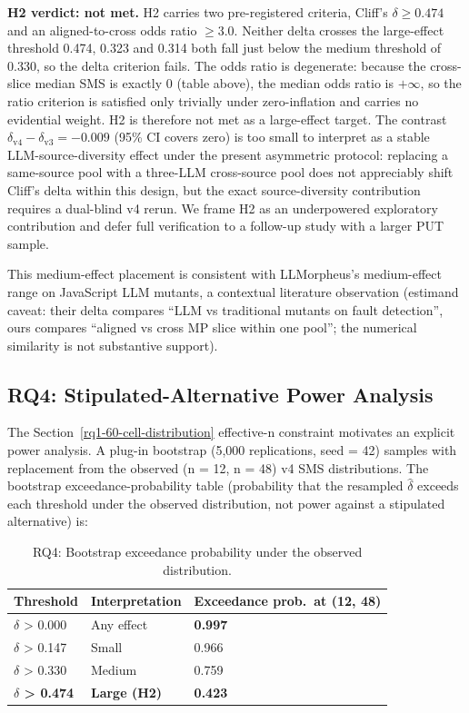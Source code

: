 \documentclass[12pt]{article}
\begin{document}
\textbf{H2 verdict: not met.} H2 carries two pre-registered criteria,
Cliff's $\delta \geq 0.474$ and an aligned-to-cross odds ratio
$\geq 3.0$. Neither delta crosses the \citet{romano2006cliff}
large-effect threshold 0.474, 0.323 and 0.314 both fall just below the
\citet{romano2006cliff} medium threshold of 0.330, so the delta criterion fails. The
odds ratio is degenerate: because the cross-slice median SMS is exactly
0 (table above), the median odds ratio is $+\infty$, so the ratio
criterion is satisfied only trivially under zero-inflation and carries no
evidential weight. H2 is therefore not met as a large-effect target. The
contrast $\delta_{\mathrm{v4}} - \delta_{\mathrm{v3}} = -0.009$ (95\% CI covers
zero) is too small to interpret as a stable LLM-source-diversity effect
under the present asymmetric protocol: replacing a same-source pool with
a three-LLM cross-source pool does not appreciably shift Cliff's delta
within this design, but the exact source-diversity contribution requires
a dual-blind v4 rerun. We frame H2 as an underpowered exploratory
contribution and defer full verification to a follow-up study with a
larger PUT sample.

This medium-effect placement is consistent with \citet{tip2025llmorpheus}
LLMorpheus's medium-effect range on JavaScript LLM mutants, a contextual
literature observation (estimand caveat: their delta compares ``LLM vs
traditional mutants on fault detection'', ours compares ``aligned vs
cross MP slice within one pool''; the numerical similarity is not
substantive support).

\subsection{RQ4: Stipulated-Alternative Power Analysis}\label{rq2-stipulated-alternative-power}

The Section~\ref{rq1-60-cell-distribution} effective-n constraint motivates an explicit power analysis. A
plug-in bootstrap (5,000 replications, seed = 42) samples with
replacement from the observed (n = 12, n = 48) v4 SMS distributions. The
bootstrap exceedance-probability table (probability that the resampled
$\hat\delta$ exceeds each threshold under the observed distribution, not
power against a stipulated alternative) is:

{\def\LTcaptype{table} %
\begin{longtable}[]{@{}lll@{}}
\caption{RQ4: Bootstrap exceedance probability under the observed
distribution.}\\
\toprule\noalign{}
Threshold & Interpretation & Exceedance prob.\ at (12, 48) \\
\midrule\noalign{}
\endhead
\bottomrule\noalign{}
\endlastfoot
$\delta$ \textgreater{} 0.000 & Any effect & \textbf{0.997} \\
$\delta$ \textgreater{} 0.147 & Small & 0.966 \\
$\delta$ \textgreater{} 0.330 & Medium & 0.759 \\
\textbf{$\delta$ \textgreater{} 0.474} & \textbf{Large (H2)} &
\textbf{0.423} \\
\end{longtable}
}
\end{document}
